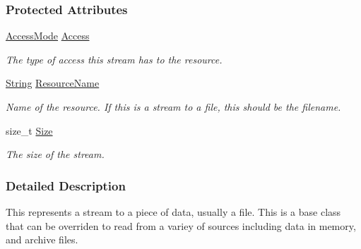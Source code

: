 \subsubsection*{Protected Attributes}
\begin{DoxyCompactItemize}
\item 
\hypertarget{classMezzanine_1_1Resource_1_1DataStream_a1331a3a41cc51912619443af35b0a4f6}{
\hyperlink{classMezzanine_1_1Resource_1_1DataStream_afe2916e4ed8c06130d032d99c5a532f2}{AccessMode} \hyperlink{classMezzanine_1_1Resource_1_1DataStream_a1331a3a41cc51912619443af35b0a4f6}{Access}}
\label{classMezzanine_1_1Resource_1_1DataStream_a1331a3a41cc51912619443af35b0a4f6}

\begin{DoxyCompactList}\small\item\em The type of access this stream has to the resource. \item\end{DoxyCompactList}\item 
\hypertarget{classMezzanine_1_1Resource_1_1DataStream_a4c8f09b002ce06283df8f1f1791fef07}{
\hyperlink{namespaceMezzanine_acf9fcc130e6ebf08e3d8491aebcf1c86}{String} \hyperlink{classMezzanine_1_1Resource_1_1DataStream_a4c8f09b002ce06283df8f1f1791fef07}{ResourceName}}
\label{classMezzanine_1_1Resource_1_1DataStream_a4c8f09b002ce06283df8f1f1791fef07}

\begin{DoxyCompactList}\small\item\em Name of the resource. If this is a stream to a file, this should be the filename. \item\end{DoxyCompactList}\item 
\hypertarget{classMezzanine_1_1Resource_1_1DataStream_a3d92c94764fb8d3cdd1c7e4575625a51}{
size\_\-t \hyperlink{classMezzanine_1_1Resource_1_1DataStream_a3d92c94764fb8d3cdd1c7e4575625a51}{Size}}
\label{classMezzanine_1_1Resource_1_1DataStream_a3d92c94764fb8d3cdd1c7e4575625a51}

\begin{DoxyCompactList}\small\item\em The size of the stream. \item\end{DoxyCompactList}\end{DoxyCompactItemize}


\subsubsection{Detailed Description}
This represents a stream to a piece of data, usually a file. This is a base class that can be overriden to read from a variey of sources including data in memory, and archive files. 

